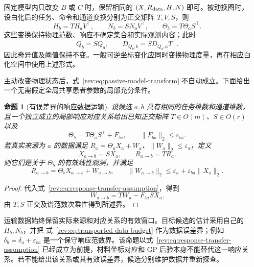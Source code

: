 \documentclass[11pt,a4paper]{article}
\numberwithin{equation}{section}
\newtheorem{proposition}[theorem]{命题}
\theoremstyle{definition}
\begin{document}
固定模型内只改变 $B$ 或 $C$ 时，保留相同的
$(X,R_{\rm data},H,N)$ 即可。被动换图时，设白化后的任务、命令和通道变换分别为正交矩阵
$T,V,S$，则
\begin{equation}
 H_b=TH_aV^\top,\qquad
 N_b=SN_aV^\top,\qquad
 \Theta_b=T\Theta_aS^\top .
 \label{rev:eq:passive-model-transform}
\end{equation}
这些变换保持物理范数、响应不确定集合和实际观测内容；此时
\begin{equation}
 Q_b=SQ_a,\qquad
 D_{Q_b,b}=S D_{Q_a,a}T^\top .
 \label{rev:eq:passive-quotient-transform}
\end{equation}
因此奇异值及阈值保持不变。一般可逆坐标变化应同时变换物理度量，再在相应白化空间中使用上述形式。

主动改变物理状态后，式~\eqref{rev:eq:passive-model-transform} 不自动成立。下面给出一个无需假定全局共享患者参数的局部充分条件。

\begin{proposition}[有误差界的响应数据运输]
\label{rev:prop:data-transfer}
设候选 $a,b$ 具有相同的任务维数和通道维数，且一个独立成立的局部响应对应关系给出已知正交矩阵
$T\in O(m)$、$S\in O(r)$ 以及
\begin{equation}
 \Theta_b=T\Theta_aS^\top+F_{ba},
 \qquad
 \|F_{ba}\|_2\le\varepsilon_{ba}.
 \label{rev:eq:response-transfer-assumption}
\end{equation}
若真实来源为 $a$ 的数据满足
$R_a=\Theta_aX_a+W_a$、$\|W_a\|_2\le\varepsilon_a$，定义
\begin{equation}
 X_{a\to b}=SX_a,\qquad
 R_{a\to b}=TR_a .
 \label{rev:eq:transported-calibration-data}
\end{equation}
则它们是关于 $\Theta_b$ 的有效线性观测，并满足
\begin{equation}
 R_{a\to b}=\Theta_bX_{a\to b}+W_{a\to b},
 \qquad
 \|W_{a\to b}\|_2
 \le\varepsilon_a+\varepsilon_{ba}\|X_a\|_2 .
 \label{rev:eq:transported-data-budget}
\end{equation}
\end{proposition}
\begin{proof}
代入式~\eqref{rev:eq:response-transfer-assumption}，得到
\begin{equation}
 W_{a\to b}=TW_a-F_{ba}SX_a.
\end{equation}
由 $T,S$ 正交及谱范数次乘性得到所述界。
\end{proof}

运输数据始终保留实际来源和对应关系的有效窗口。目标候选的估计采用自己的 $H_b,N_b$，并把
式~\eqref{rev:eq:transported-data-budget} 作为数据误差界；例如
$\delta_b=\delta_a+\varepsilon_{ba}$ 是一个保守响应范数界。该命题以式~\eqref{rev:eq:response-transfer-assumption} 已经成立为前提，材料坐标对应和 GP 后验本身不能替代这一响应关系。若不能给出该关系或其有效误差界，候选分别维护数据并重新探查。
\end{document}
